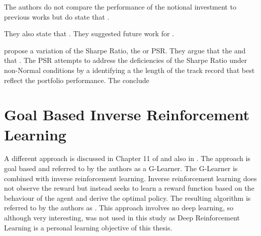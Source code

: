 \documentclass[oneside,12pt]{Classes/RoboticsLaTeX}
\begin{document}
The authors do not compare the performance of the notional investment to previous works but do state that \citep[p10]{ABOUSSALAH2020112891}.

They also state that  \citep[p12]{ABOUSSALAH2020112891}. They suggested future work for .

\citep{BaileyDavidH2012Tsre} propose a variation of the Sharpe Ratio, the  \citep[p.3]{BaileyDavidH2012Tsre} or PSR. They argue that the  and that  \citet[p.4]{BaileyDavidH2012Tsre}. The PSR attempts to address the deficiencies of the Sharpe Ratio under non-Normal conditions by a identifying a the length of the track record that best reflect the portfolio performance. The conclude  \citep[p.15]{BaileyDavidH2012Tsre}

\section{Goal Based Inverse Reinforcement Learning}
A different approach is discussed in Chapter 11 of \citet{DixonMatthewF2020MLiF} and also in \citet{dixon2020glearner}. The approach is goal based and referred to by the authors as a G-Learner. The G-Learner is combined with inverse reinforcement learning. Inverse reinforcement learning does not observe the reward but instead seeks to learn a reward function based on the behaviour of the agent and derive the optimal policy. The resulting algorithm is referred to by the authors as  \citep[p5-18]{dixon2020glearner}. This approach involves no deep learning, so although very interesting, was not used in this study as Deep Reinforcement Learning is a personal learning objective of this thesis.                                                                                         
\end{document}
